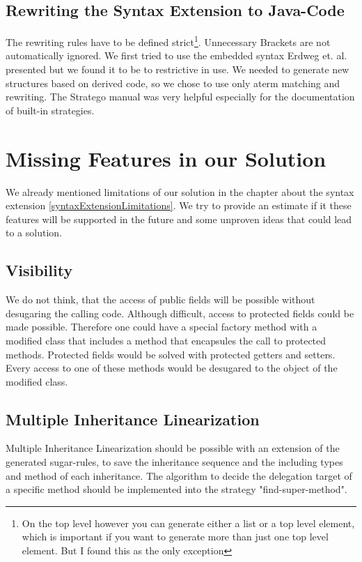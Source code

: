\documentclass{report}
\begin{document}
\subsection{Rewriting the Syntax Extension to Java-Code}
The rewriting rules have to be defined strict\footnote{On the top level however you can generate either a list or a top level element, which is important if you want to generate more than just one top level element. But I found this as the only exception}. Unnecessary Brackets are not automatically ignored. We first tried to use the embedded syntax Erdweg et. al. presented but we found it to be to restrictive in use. We needed to generate new structures based on derived code, so we chose to use only aterm matching and rewriting. The Stratego manual \cite{Stratego-Manual} was very helpful especially for the documentation of built-in strategies.

\section{Missing Features in our Solution}
We already mentioned limitations of our solution in the chapter about the syntax extension \ref{syntaxExtensionLimitations}. We try to provide an estimate if it these features will be supported in the future and some unproven ideas that could lead to a solution.


\subsection{Visibility}

We do not think, that the access of public fields will be possible without desugaring the calling code. Although difficult, access to protected fields could be made possible. Therefore one could have a special factory method with a modified class that includes a method that encapsules the call to protected methods. Protected fields would be solved with protected getters and setters. Every access to one of these methods would be desugared to the object of the modified class.

\subsection{Multiple Inheritance Linearization}
\label{solutionMultipleInheritanceLinearization}
Multiple Inheritance Linearization should be possible with an extension of the generated sugar-rules, to save the inheritance sequence and the including types and method of each inheritance. The algorithm to decide the delegation target of a specific method should be implemented into the strategy "find-super-method".
\end{document}
